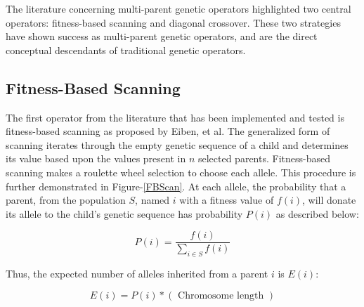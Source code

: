 The literature concerning multi-parent genetic operators highlighted two central operators: fitness-based scanning and diagonal crossover. These two strategies have shown success as multi-parent genetic operators, and are the direct conceptual descendants of traditional genetic operators.

\subsection*{Fitness-Based Scanning}
The first operator from the literature that has been implemented and tested is fitness-based scanning as proposed by Eiben, et al\cite{Eiben94}. The generalized form of scanning iterates through the empty genetic sequence of a child and determines its value based upon the values present in $n$ selected parents\cite{Eiben91}. Fitness-based scanning makes a roulette wheel selection to choose each allele. This procedure is further demonstrated in Figure-\ref{FBScan}. At each allele, the probability that a parent, from the population $S$, named $i$ with a fitness value of $f(i)$, will donate its allele to the child's genetic sequence has probability $P(i)$ as described below\cite{Eiben94}: 

\[ P(i) = \frac{f(i)}{\sum\limits_{i \in S} f(i)} \]

\noindent Thus, the expected number of alleles inherited from a parent $i$ is $E(i)$\cite{Eiben94}:

\[ E(i) = P(i) *(\text{ Chromosome length }) \]


